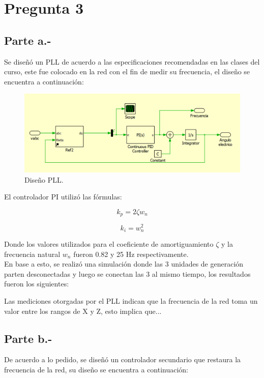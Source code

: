 \section{Pregunta 3}

\subsection{Parte a.-}

Se diseñó un PLL de acuerdo a las especificaciones recomendadas en las clases del curso, este fue colocado en la red con el fin de medir su frecuencia, el diseño se encuentra a continuación:

\begin{figure}
   \centering
   \includegraphics[width=0.5\linewidth]{Tarea 1/report/imagenes/p3a/pllred.png}
   \caption{Diseño PLL.}
   \label{diseñopll}
\end{figure}

El controlador PI utilizó las fórmulas:

\begin{equation}
    k_p = 2\zeta w_{n}
\end{equation}

\begin{equation}
    k_i = w_{n}^2
\end{equation}

Donde los valores utilizados para el coeficiente de amortiguamiento $\zeta$ y la frecuencia natural $w_{n}$ fueron 0.82 y 25 Hz respectivamente.\\

En base a esto, se realizó una simulación donde las 3 unidades de generación parten desconectadas y luego se conectan las 3 al mismo tiempo, los resultados fueron los siguientes:



Las mediciones otorgadas por el PLL indican que la frecuencia de la red toma un valor entre los rangos de X y Z, esto implica que...

\subsection{Parte b.-}

De acuerdo a lo pedido, se diseñó un controlador secundario que restaura la frecuencia de la red, su diseño se encuentra a continuación:

